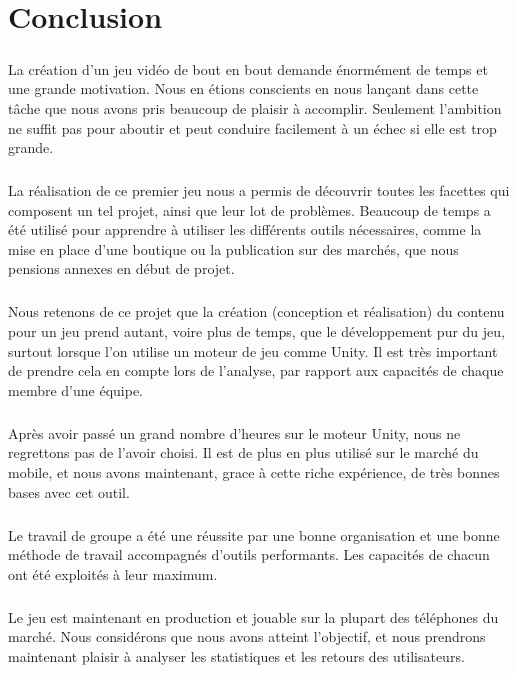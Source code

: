\chapter{Conclusion}

\paragraph{}
La création d’un jeu vidéo de bout en bout demande énormément de temps et une grande motivation. Nous en étions conscients en nous lançant dans cette tâche que nous avons pris beaucoup de plaisir à accomplir. Seulement l’ambition ne suffit pas pour aboutir et peut conduire facilement à un échec si elle est trop grande.

\paragraph{}
La réalisation de ce premier jeu nous a permis de découvrir toutes les facettes qui composent un tel projet, ainsi que leur lot de problèmes. Beaucoup de temps a été utilisé pour apprendre à utiliser les différents outils nécessaires, comme la mise en place d’une boutique ou la publication sur des marchés, que nous pensions annexes en début de projet.

\paragraph{}
Nous retenons de ce projet que la création (conception et réalisation) du contenu pour un jeu prend autant, voire plus de temps, que le développement pur du jeu, surtout lorsque l'on utilise un moteur de jeu comme Unity. Il est très important de prendre cela en compte lors de l’analyse, par rapport aux capacités de chaque membre d'une équipe.

\paragraph{}
Après avoir passé un grand nombre d'heures sur le moteur Unity, nous ne regrettons pas de l'avoir choisi. Il est de plus en plus utilisé sur le marché du mobile, et nous avons maintenant, grace à cette riche expérience, de très bonnes bases avec cet outil.

\paragraph{}
Le travail de groupe a été une réussite par une bonne organisation et une bonne méthode de travail accompagnés d'outils performants. Les capacités de chacun ont été exploités à leur maximum.

\paragraph{}
Le jeu est maintenant en production et jouable sur la plupart des téléphones du marché. Nous considérons que nous avons atteint l'objectif, et nous prendrons maintenant plaisir à analyser les statistiques et les retours des utilisateurs.
